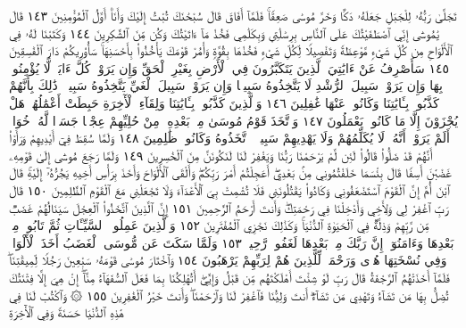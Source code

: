 تَجَلَّىٰ رَبُّهُۥ لِلْجَبَلِ جَعَلَهُۥ دَكࣰّا وَخَرَّ مُوسَىٰ صَعِقࣰاۚ فَلَمَّآ
أَفَاقَ قَالَ سُبْحَٰنَكَ تُبْتُ إِلَيْكَ وَأَنَا۠ أَوَّلُ ٱلْمُؤْمِنِينَ ١٤٣
قَالَ يَٰمُوسَىٰٓ إِنِّي ٱصْطَفَيْتُكَ عَلَى ٱلنَّاسِ بِرِسَٰلَٰتِي وَبِكَلَٰمِي
فَخُذْ مَآ ءَاتَيْتُكَ وَكُن مِّنَ ٱلشَّٰكِرِينَ ١٤٤ وَكَتَبْنَا
لَهُۥ فِي ٱلْأَلْوَاحِ مِن كُلِّ شَيْءࣲ مَّوْعِظَةࣰ وَتَفْصِيلࣰا لِّكُلِّ
شَيْءࣲ فَخُذْهَا بِقُوَّةࣲ وَأْمُرْ قَوْمَكَ يَأْخُذُوا۟ بِأَحْسَنِهَاۚ سَأُو۟رِيكُمْ
دَارَ ٱلْفَٰسِقِينَ ١٤٥ سَأَصْرِفُ عَنْ ءَايَٰتِيَ ٱلَّذِينَ يَتَكَبَّرُونَ
فِي ٱلْأَرْضِ بِغَيْرِ ٱلْحَقِّ وَإِن يَرَوْا۟ كُلَّ ءَايَةࣲ لَّا يُؤْمِنُوا۟ بِهَا
وَإِن يَرَوْا۟ سَبِيلَ ٱلرُّشْدِ لَا يَتَّخِذُوهُ سَبِيلࣰا وَإِن يَرَوْا۟ سَبِيلَ
ٱلْغَيِّ يَتَّخِذُوهُ سَبِيلࣰاۚ ذَٰلِكَ بِأَنَّهُمْ كَذَّبُوا۟ بِـَٔايَٰتِنَا
وَكَانُوا۟ عَنْهَا غَٰفِلِينَ ١٤٦ وَٱلَّذِينَ كَذَّبُوا۟ بِـَٔايَٰتِنَا
وَلِقَآءِ ٱلْأٓخِرَةِ حَبِطَتْ أَعْمَٰلُهُمْۚ هَلْ يُجْزَوْنَ إِلَّا مَا كَانُوا۟
يَعْمَلُونَ ١٤٧ وَٱتَّخَذَ قَوْمُ مُوسَىٰ مِنۢ بَعْدِهِۦ مِنْ حُلِيِّهِمْ
عِجْلࣰا جَسَدࣰا لَّهُۥ خُوَارٌۚ أَلَمْ يَرَوْا۟ أَنَّهُۥ لَا يُكَلِّمُهُمْ
وَلَا يَهْدِيهِمْ سَبِيلًاۘ ٱتَّخَذُوهُ وَكَانُوا۟ ظَٰلِمِينَ ١٤٨
وَلَمَّا سُقِطَ فِيٓ أَيْدِيهِمْ وَرَأَوْا۟ أَنَّهُمْ قَدْ ضَلُّوا۟ قَالُوا۟ لَئِن
لَّمْ يَرْحَمْنَا رَبُّنَا وَيَغْفِرْ لَنَا لَنَكُونَنَّ مِنَ ٱلْخَٰسِرِينَ ١٤٩
وَلَمَّا رَجَعَ مُوسَىٰٓ إِلَىٰ قَوْمِهِۦ غَضْبَٰنَ أَسِفࣰا قَالَ بِئْسَمَا خَلَفْتُمُونِي
مِنۢ بَعْدِيٓۖ أَعَجِلْتُمْ أَمْرَ رَبِّكُمْۖ وَأَلْقَى ٱلْأَلْوَاحَ وَأَخَذَ بِرَأْسِ
أَخِيهِ يَجُرُّهُۥٓ إِلَيْهِۚ قَالَ ٱبْنَ أُمَّ إِنَّ ٱلْقَوْمَ ٱسْتَضْعَفُونِي وَكَادُوا۟
يَقْتُلُونَنِي فَلَا تُشْمِتْ بِيَ ٱلْأَعْدَآءَ وَلَا تَجْعَلْنِي مَعَ ٱلْقَوْمِ
ٱلظَّٰلِمِينَ ١٥٠ قَالَ رَبِّ ٱغْفِرْ لِي وَلِأَخِي وَأَدْخِلْنَا فِي رَحْمَتِكَۖ
وَأَنتَ أَرْحَمُ ٱلرَّٰحِمِينَ ١٥١ إِنَّ ٱلَّذِينَ ٱتَّخَذُوا۟ ٱلْعِجْلَ سَيَنَالُهُمْ
غَضَبࣱ مِّن رَّبِّهِمْ وَذِلَّةࣱ فِي ٱلْحَيَوٰةِ ٱلدُّنْيَاۚ وَكَذَٰلِكَ نَجْزِي
ٱلْمُفْتَرِينَ ١٥٢ وَٱلَّذِينَ عَمِلُوا۟ ٱلسَّيِّـَٔاتِ ثُمَّ تَابُوا۟ مِنۢ
بَعْدِهَا وَءَامَنُوٓا۟ إِنَّ رَبَّكَ مِنۢ بَعْدِهَا لَغَفُورࣱ رَّحِيمࣱ ١٥٣
وَلَمَّا سَكَتَ عَن مُّوسَى ٱلْغَضَبُ أَخَذَ ٱلْأَلْوَاحَۖ وَفِي نُسْخَتِهَا
هُدࣰى وَرَحْمَةࣱ لِّلَّذِينَ هُمْ لِرَبِّهِمْ يَرْهَبُونَ ١٥٤ وَٱخْتَارَ مُوسَىٰ
قَوْمَهُۥ سَبْعِينَ رَجُلࣰا لِّمِيقَٰتِنَاۖ فَلَمَّآ أَخَذَتْهُمُ ٱلرَّجْفَةُ قَالَ
رَبِّ لَوْ شِئْتَ أَهْلَكْتَهُم مِّن قَبْلُ وَإِيَّٰيَۖ أَتُهْلِكُنَا بِمَا فَعَلَ
ٱلسُّفَهَآءُ مِنَّآۖ إِنْ هِيَ إِلَّا فِتْنَتُكَ تُضِلُّ بِهَا مَن تَشَآءُ وَتَهْدِي
مَن تَشَآءُۖ أَنتَ وَلِيُّنَا فَٱغْفِرْ لَنَا وَٱرْحَمْنَاۖ وَأَنتَ خَيْرُ ٱلْغَٰفِرِينَ ١٥٥
۞ وَٱكْتُبْ لَنَا فِي هَٰذِهِ ٱلدُّنْيَا حَسَنَةࣰ وَفِي ٱلْأٓخِرَةِ
